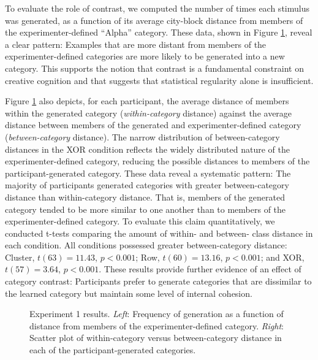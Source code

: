 \documentclass[12pt]{article}
\newcommand\inputpgf[2]{{
\let\pgfimageWithoutPath\pgfimage
\renewcommand{\pgfimage}[2][]{\pgfimageWithoutPath[##1]{#1/##2}}

}}
\begin{document}
\begin{flushleft}
To evaluate the role of contrast, we computed the number of times each stimulus
was generated, as a function of its average city-block distance from members of
the experimenter-defined ``Alpha'' category. These data, shown in Figure
\ref{fig:e1-distanceplots}, reveal a clear pattern: Examples that are more
distant from members of the experimenter-defined categories are more likely to
be generated into a new category. This supports the notion that contrast is a
fundamental constraint on creative cognition and that suggests that statistical
regularity alone is insufficient.


Figure \ref{fig:e1-distanceplots} also depicts, for each participant, the
average distance of members within the generated category ({\em within-category}
distance) against the average distance between members of the generated and
experimenter-defined category ({\em between-category} distance). The narrow
distribution of between-category distances in the XOR condition reflects the
widely distributed nature of the experimenter-defined category, reducing the
possible distances to members of the participant-generated category. These data
reveal a systematic pattern: The majority of participants generated categories
with greater between-category distance than within-category distance. That is,
members of the generated category tended to be more similar to one another than
to members of the experimenter-defined category. To evaluate this claim
quantitatively, we conducted t-tests comparing the amount of within- and
between- class distance in each condition. All conditions possessed greater
between-category distance: Cluster, $t(63) = 11.43$, $p < 0.001$; Row, $t(60) =
13.16$, $p < 0.001$; and XOR, $t(57) = 3.64$, $p < 0.001$. These results provide
further evidence of an effect of category contrast: Participants prefer to
generate categories that are dissimilar to the learned category but maintain
some level of internal cohesion.

\begin{figure}
    \begin{center} \inputpgf{figs/}{e1-distanceplots.pgf}
    \caption{Experiment 1 results. {\em Left}: Frequency of generation as a
function of distance from members of the experimenter-defined category. {\em
Right}: Scatter plot of within-category versus between-category distance in each
of the participant-generated categories.}
    \label{fig:e1-distanceplots}
    \end{center}
\end{figure}


\end{flushleft}
\end{document}
